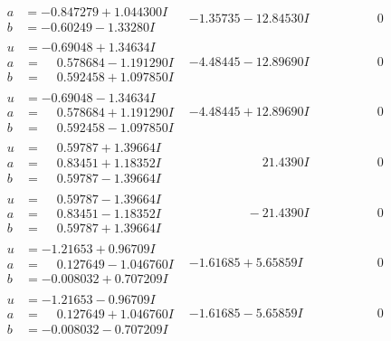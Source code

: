 \documentclass[1p]{elsarticle_modified}
\theoremstyle{definition}
\begin{document}
$$\begin{array}{c|c|c}
\begin{aligned}
a &= -0.847279 + 1.044300 I \\
b &= -0.60249 - 1.33280 I\end{aligned}
 & -1.35735 - 12.84530 I & \phantom{-0.000000 } 0 \\ \hline\begin{aligned}
u &= -0.69048 + 1.34634 I \\
a &= \phantom{-}0.578684 - 1.191290 I \\
b &= \phantom{-}0.592458 + 1.097850 I\end{aligned}
 & -4.48445 - 12.89690 I & \phantom{-0.000000 } 0 \\ \hline\begin{aligned}
u &= -0.69048 - 1.34634 I \\
a &= \phantom{-}0.578684 + 1.191290 I \\
b &= \phantom{-}0.592458 - 1.097850 I\end{aligned}
 & -4.48445 + 12.89690 I & \phantom{-0.000000 } 0 \\ \hline\begin{aligned}
u &= \phantom{-}0.59787 + 1.39664 I \\
a &= \phantom{-}0.83451 + 1.18352 I \\
b &= \phantom{-}0.59787 - 1.39664 I\end{aligned}
 & \phantom{-0.000000 -}21.4390 I & \phantom{-0.000000 } 0 \\ \hline\begin{aligned}
u &= \phantom{-}0.59787 - 1.39664 I \\
a &= \phantom{-}0.83451 - 1.18352 I \\
b &= \phantom{-}0.59787 + 1.39664 I\end{aligned}
 & \phantom{-0.000000 } -21.4390 I & \phantom{-0.000000 } 0 \\ \hline\begin{aligned}
u &= -1.21653 + 0.96709 I \\
a &= \phantom{-}0.127649 - 1.046760 I \\
b &= -0.008032 + 0.707209 I\end{aligned}
 & -1.61685 + 5.65859 I & \phantom{-0.000000 } 0 \\ \hline\begin{aligned}
u &= -1.21653 - 0.96709 I \\
a &= \phantom{-}0.127649 + 1.046760 I \\
b &= -0.008032 - 0.707209 I\end{aligned}
 & -1.61685 - 5.65859 I & \phantom{-0.000000 } 0 \\ \hline\begin{aligned}

\end{aligned}
\end{array}$$
\end{document}
